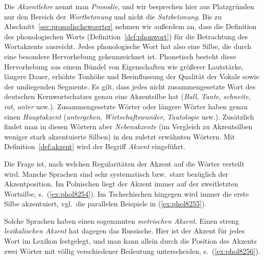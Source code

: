 Die \textit{Akzentlehre} nennt man \textit{Prosodie}, und wir besprechen hier aus Platzgründen nur den Bereich der \textit{Wortbetonung} und \zB nicht die \textit{Satzbetonung}.
Bis zu Abschnitt~\ref{sec:prosodischewoerter} nehmen wir außerdem an, dass die Definition des phonologischen Worts (Definition~\ref{def:phonwort}) für die Betrachtung des Wortakzents ausreicht.
Jedes phonologische Wort hat also eine Silbe, die durch eine besondere Hervorhebung gekennzeichnet ist.
Phonetisch besteht diese Hervorhebung aus einem Bündel von Eigenschaften wie größerer Lautstärke, längere Dauer, erhöhte Tonhöhe und Beeinflussung der Qualität der Vokale sowie der umliegenden Segmente.
Es gilt, dass jedes nicht zusammengesetzte Wort des deutschen Kernwortschatzes genau eine Akzentsilbe hat (\textit{\Akz Ball}, \textit{\Akz Tante}, \textit{\Akz schneite}, \textit{\Akz rot}, \textit{\Akz unter} usw.).
Zusammengesetzte Wörter oder längere Wörter haben genau einen \textit{Hauptakzent} (\textit{\Akz untergehen}, \textit{\Akz Wirtschaftswunder}, \textit{Tautolo\Akz gie} usw.).
Zusätzlich findet man in diesen Wörtern aber \textit{Nebenakzente} (im Vergleich zu Akzentsilben weniger stark akzentuierte Silben) in den zuletzt erwähnten Wörtern.
Mit Definition~\ref{def:akzent} wird der Begriff \textit{Akzent} eingeführt.




Die Frage ist, nach welchen Regularitäten der Akzent auf die Wörter verteilt wird.
Manche Sprachen sind sehr systematisch bzw.\ starr bezüglich der Akzentposition.
Im Polnischen liegt der Akzent immer auf der zweitletzten Wortsilbe, s.\ (\ref{ex:phol8254}).
Im Tschechischen hingegen wird immer die erste Silbe akzentuiert, vgl.\ die parallelen Beispiele in (\ref{ex:phol8255}).

\begin{exe}
\end{exe}

Solche Sprachen haben einen sogenannten \textit{metrischen Akzent}.
Einen streng \textit{lexikalischen Akzent} hat dagegen das Russische.
Hier ist der Akzent für jedes Wort im Lexikon festgelegt, und man kann allein durch die Position des Akzents zwei Wörter mit völlig verschiedener Bedeutung unterscheiden, s.\ (\ref{ex:phol8256}).

